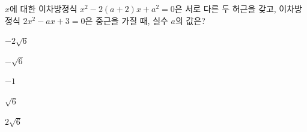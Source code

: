 $x$에 대한 이차방정식 $x^2-2(a+2)x+a^2=0$은 서로 다른 두 허근을 갖고, 이차방정식 $2x^2-ax+3=0$은 중근을 가질 때, 실수 $a$의 값은?
\begin{choices32}{\rule[-3ex]{0pt}{8ex}$-2\sqrt{6}$}{\rule[-3ex]{0pt}{8ex}$-\sqrt{6}$}{\rule[-3ex]{0pt}{8ex}$-1$}{\rule[-3ex]{0pt}{8ex}$\sqrt{6}$}{\rule[-3ex]{0pt}{8ex}$2\sqrt{6}$}\end{choices32}
